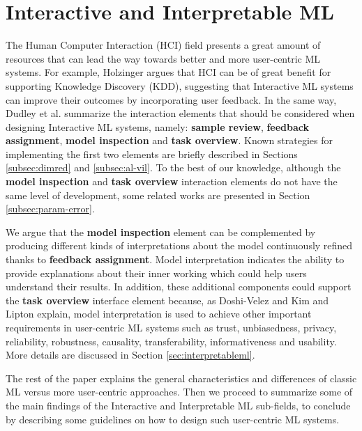 
\chapter{Interactive and Interpretable ML}
\label{chapter2}

\graphicspath{{Chapter2/figs/}}

The Human Computer Interaction (HCI) field presents a great amount of resources that can lead the way towards better and more user-centric ML systems. For example, Holzinger \cite{Holzinger2016} argues that HCI can be of great benefit for supporting Knowledge Discovery (KDD), suggesting that Interactive ML systems can improve their outcomes by incorporating user feedback. In the same way, Dudley et al. \cite{Dudley2018} summarize the interaction elements that should be considered when designing Interactive ML systems, namely: \textbf{sample review}, \textbf{feedback assignment}, \textbf{model inspection} and \textbf{task overview}. Known strategies for implementing the first two elements are briefly described in Sections \ref{subsec:dimred} and \ref{subsec:al-vil}. To the best of our knowledge, although the \textbf{model inspection} and \textbf{task overview} interaction elements do not have the same level of development, some related works are presented in Section \ref{subsec:param-error}.

We argue that the \textbf{model inspection} element can be complemented by producing different kinds of interpretations about the model continuously refined thanks to \textbf{feedback assignment}. Model interpretation indicates the ability to provide explanations about their inner working which could help users understand their results. In addition, these additional components could support the \textbf{task overview} interface element because, as Doshi-Velez and Kim \cite{Doshi-Velez2017c} and Lipton \cite{Lipton2017TheInterpretability} explain, model interpretation is used to achieve other important requirements in user-centric ML systems such as trust, unbiasedness, privacy, reliability, robustness, causality, transferability, informativeness and usability. More details are discussed in Section \ref{sec:interpretableml}.

The rest of the paper explains the general characteristics and differences of classic ML versus more user-centric approaches. Then we proceed to summarize some of the main findings of the Interactive and Interpretable ML sub-fields, to conclude by describing some guidelines on how to design such user-centric ML systems.

